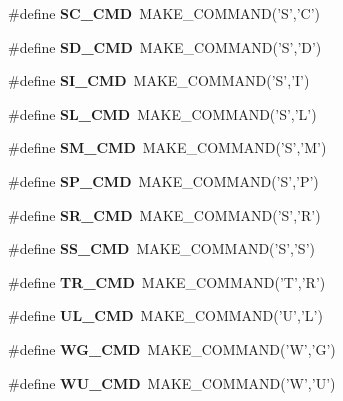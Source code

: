 \begin{DoxyCompactItemize}
\item 
\#define {\bfseries SC\_\-CMD}~MAKE\_\-COMMAND('S','C')\label{hpgsreader_8h_a56959c6d741cf2385a9e3e371c998795}

\item 
\#define {\bfseries SD\_\-CMD}~MAKE\_\-COMMAND('S','D')\label{hpgsreader_8h_a3a714a780ec94c00437096eee9f49716}

\item 
\#define {\bfseries SI\_\-CMD}~MAKE\_\-COMMAND('S','I')\label{hpgsreader_8h_a2c486800b74c3f310e4dc777acae957a}

\item 
\#define {\bfseries SL\_\-CMD}~MAKE\_\-COMMAND('S','L')\label{hpgsreader_8h_abb05ae88dd8995ac8e1b302a792612c7}

\item 
\#define {\bfseries SM\_\-CMD}~MAKE\_\-COMMAND('S','M')\label{hpgsreader_8h_a1fc7af83959a967c7af7236ba1999833}

\item 
\#define {\bfseries SP\_\-CMD}~MAKE\_\-COMMAND('S','P')\label{hpgsreader_8h_a238d5dba110652313b5b0bd4374921a4}

\item 
\#define {\bfseries SR\_\-CMD}~MAKE\_\-COMMAND('S','R')\label{hpgsreader_8h_ad3465143c05373320a4af026815037f3}

\item 
\#define {\bfseries SS\_\-CMD}~MAKE\_\-COMMAND('S','S')\label{hpgsreader_8h_ab610fdaab244557cdcd355b330121963}

\item 
\#define {\bfseries TR\_\-CMD}~MAKE\_\-COMMAND('T','R')\label{hpgsreader_8h_af6601cf20799d3ce9ff7a6dd92a8ef17}

\item 
\#define {\bfseries UL\_\-CMD}~MAKE\_\-COMMAND('U','L')\label{hpgsreader_8h_ad90c8439ec9229b38140b8271d4afd19}

\item 
\#define {\bfseries WG\_\-CMD}~MAKE\_\-COMMAND('W','G')\label{hpgsreader_8h_ad3f341bed7d3d5bc787c0b6a48b58978}

\item 
\#define {\bfseries WU\_\-CMD}~MAKE\_\-COMMAND('W','U')\label{hpgsreader_8h_a79de8678b6b33dda1e6602cd6d0f536f}

\end{DoxyCompactItemize}
